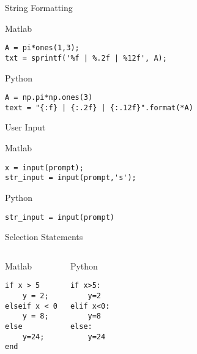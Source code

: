 \documentclass[xcolor={dvipsnames}]{beamer}
\begin{document}
\begin{frame}[fragile]{String Formatting}

\begin{block}{Matlab}
\begin{verbatim}
A = pi*ones(1,3);
txt = sprintf('%f | %.2f | %12f', A);
\end{verbatim}
\end{block}

\begin{block}{Python}
\begin{verbatim}
A = np.pi*np.ones(3)
text = "{:f} | {:.2f} | {:.12f}".format(*A)
\end{verbatim}
\end{block}
\end{frame}

\begin{frame}[fragile]{User Input}

\begin{block}{Matlab}
\begin{verbatim}
x = input(prompt);
str_input = input(prompt,'s');
\end{verbatim}
\end{block}

\begin{block}{Python}
\begin{verbatim}
str_input = input(prompt)
\end{verbatim}
\end{block}
\end{frame}

\begin{frame}[fragile]{Selection Statements}

\begin{columns}
\begin{block}{Matlab}
\begin{verbatim}
if x > 5
    y = 2;
elseif x < 0
    y = 8;
else
    y=24;
end
\end{verbatim}
\end{block}

\begin{block}{Python}
\begin{verbatim}
if x>5:
    y=2
elif x<0:
    y=8
else:
    y=24
\end{verbatim}
\end{block}
\end{columns}
\end{frame}
\end{document}

